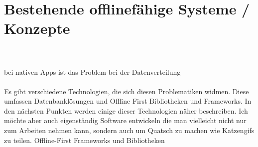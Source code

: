 \chapter{\label{chap:state}Bestehende offlinefähige Systeme / Konzepte}
\\
\\
bei nativen Apps ist das Problem bei der Datenverteilung\\\\
Es gibt verschiedene Technologien, die sich diesen Problematiken widmen.
Diese umfassen Datenbanklösungen und Offline First Bibliotheken und Frameworks. In den nächsten Punkten werden einige dieser Technologien näher beschreiben.
%
%
Ich möchte aber auch eigenständig Software entwickeln die man vielleicht nicht nur zum Arbeiten nehmen kann, sondern auch um Quatsch zu machen wie Katzengifs zu teilen.
Offline-First Frameworks und Bibliotheken
%
%

%
%

%
%

%
%

%
%

